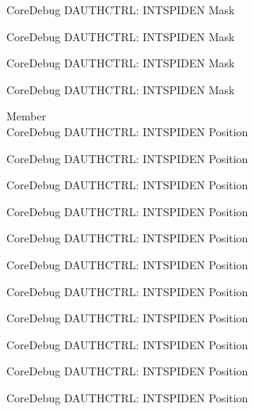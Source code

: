 \begin{DoxyRefList}
\label{deprecated__deprecated001021}%
%
Core\+Debug DAUTHCTRL\+: INTSPIDEN Mask 

\label{deprecated__deprecated001097}%
%
Core\+Debug DAUTHCTRL\+: INTSPIDEN Mask 

\label{deprecated__deprecated001200}%
%
Core\+Debug DAUTHCTRL\+: INTSPIDEN Mask 

\label{deprecated__deprecated001302}%
%
Core\+Debug DAUTHCTRL\+: INTSPIDEN Mask  
\item[Member \doxylink{group___c_m_s_i_s___s_c_b_ga3caef9790e4e2ccbfea77d55315ad59f}{Core\+Debug\+\_\+\+DAUTHCTRL\+\_\+\+INTSPIDEN\+\_\+\+Pos} ]\hfill \\
\label{deprecated__deprecated000089}%
%
Core\+Debug DAUTHCTRL\+: INTSPIDEN Position 

\label{deprecated__deprecated000143}%
%
Core\+Debug DAUTHCTRL\+: INTSPIDEN Position 

\label{deprecated__deprecated000219}%
%
Core\+Debug DAUTHCTRL\+: INTSPIDEN Position 

\label{deprecated__deprecated000282}%
%
Core\+Debug DAUTHCTRL\+: INTSPIDEN Position 

\label{deprecated__deprecated000361}%
%
Core\+Debug DAUTHCTRL\+: INTSPIDEN Position 

\label{deprecated__deprecated000437}%
%
Core\+Debug DAUTHCTRL\+: INTSPIDEN Position 

\label{deprecated__deprecated000540}%
%
Core\+Debug DAUTHCTRL\+: INTSPIDEN Position 

\label{deprecated__deprecated000642}%
%
Core\+Debug DAUTHCTRL\+: INTSPIDEN Position 

\label{deprecated__deprecated000748}%
%
Core\+Debug DAUTHCTRL\+: INTSPIDEN Position 

\label{deprecated__deprecated000802}%
%
Core\+Debug DAUTHCTRL\+: INTSPIDEN Position 

\label{deprecated__deprecated000878}%
%
Core\+Debug DAUTHCTRL\+: INTSPIDEN Position 


\end{DoxyRefList}
